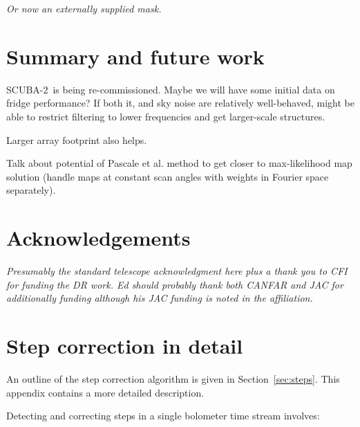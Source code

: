 \documentclass[useAMS,usenatbib,nofootinbib]{mn2e}
\newcommand{\scuba}{SCUBA-2}
\begin{document}
\textit{Or now an externally supplied mask.}

\section{Summary and future work}
\label{sec:summary}

\scuba\ is being re-commissioned. Maybe we will have some initial data
on fridge performance? If both it, and sky noise are relatively
well-behaved, might be able to restrict filtering to lower frequencies
and get larger-scale structures.

Larger array footprint also helps.

Talk about potential of Pascale et al. method to get closer to
max-likelihood map solution (handle maps at constant scan angles with
weights in Fourier space separately).

\section{Acknowledgements}

\textit{Presumably the standard telescope acknowledgment here plus a thank you
to CFI for funding the DR work. Ed should probably thank both CANFAR
and JAC for additionally funding although his JAC funding is noted in
the affiliation.}




\appendix
\section[]{Step correction in detail}

An outline of the step correction algorithm is given in
Section~\ref{sec:steps}. This appendix contains a more detailed
description.

Detecting and correcting steps in a single bolometer time stream involves:
\end{document}
